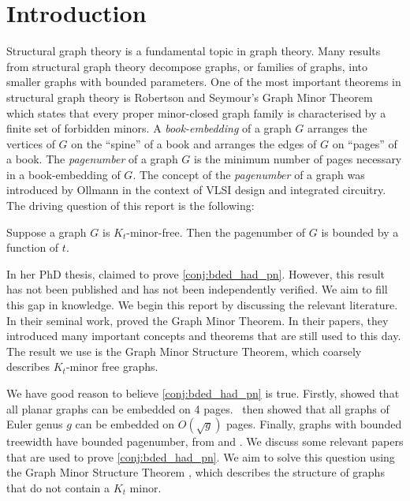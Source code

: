 \chapter{Introduction}\label{sec:introduction}
Structural graph theory is a fundamental topic in graph theory. Many results from structural graph theory decompose graphs, or families of graphs, into smaller graphs with bounded parameters. One of the most important theorems in structural graph theory is Robertson and Seymour's Graph Minor Theorem \cite{robertsonGraphMinorsXX2004} which states that every proper minor-closed graph family is characterised by a finite set of forbidden minors.
A \textit{book-embedding} of a graph $G$ arranges the vertices of $G$ on the ``spine'' of a book and arranges the edges of $G$ on ``pages'' of a book. The \textit{pagenumber} of a graph \(G\) is the minimum number of pages necessary in a book-embedding of \(G\). The concept of the \textit{pagenumber} of a graph was introduced by Ollmann \cite{ollmannBookThicknessVarious1973} in the context of VLSI design and integrated circuitry. 
The driving question of this report is the following:
\begin{conjecture}\label{conj:bded_had_pn}
	Suppose a graph $G$ is $K_t$-minor-free. Then the pagenumber of \(G\) is bounded by a function of \(t\).
\end{conjecture}
In her PhD thesis, \textcite{Blankenship-PhD03} claimed to prove \cref{conj:bded_had_pn}. However, this result has not been published and has not been independently verified. We aim to fill this gap in knowledge. 
We begin this report by discussing the relevant literature. In their seminal work, \textcite{robertsonGraphMinorsXVI2003} proved the Graph Minor Theorem. In their papers, they introduced many important concepts and theorems that are still used to this day. The result we use is the Graph Minor Structure Theorem, which coarsely describes $K_t$-minor free graphs.

We have good reason to believe \cref{conj:bded_had_pn} is true. Firstly, \textcite{yannakakisEmbeddingPlanarGraphs1989} showed that all planar graphs can be embedded on 4 pages.\ \textcite{malitzGenusGraphsHave1994} then showed that all graphs of Euler genus $g$ can be embedded on $O(\sqrt{g})$ pages. Finally, graphs with bounded treewidth have bounded pagenumber, from \textcite{ganleyPagenumberTrees2001} and \textcite{dujmovicGraphTreewidthGeometric2007}.
We discuss some relevant papers that are used to prove \cref{conj:bded_had_pn}.
We aim to solve this question using the Graph Minor Structure Theorem \cite{robertsonGraphMinorsXVI2003}, which describes the structure of graphs that do not contain a \(K_t\) minor.

